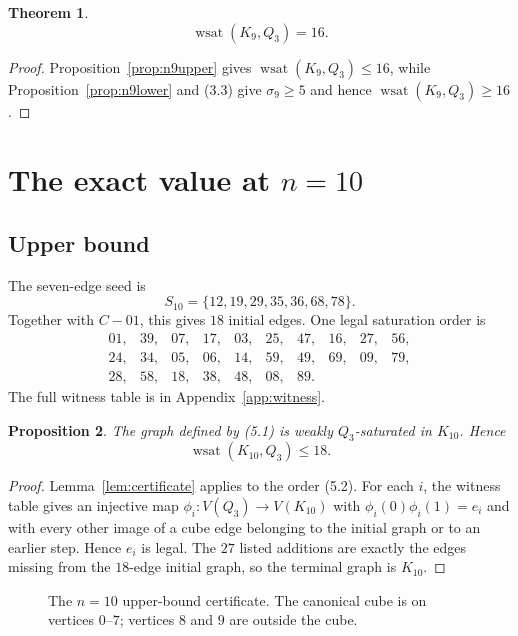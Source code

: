 \documentclass[11pt]{article}
\numberwithin{equation}{section}
\newtheorem{theorem}{Theorem}[section]
\newtheorem{proposition}[theorem]{Proposition}
\newcommand{\wsat}{\operatorname{wsat}}
\begin{document}
\begin{theorem}\label{thm:n9}
\[
\boxed{\wsat(K_9,Q_3)=16.}
\]
\end{theorem}

\begin{proof}
Proposition~\ref{prop:n9upper} gives $\wsat(K_9,Q_3)\le16$, while Proposition~\ref{prop:n9lower} and (3.3) give $\sigma_9\ge5$ and hence $\wsat(K_9,Q_3)\ge16$.
\end{proof}

\section{\texorpdfstring{The exact value at $n=10$}{The exact value at n=10}}\label{sec:n10}

\subsection{Upper bound}
The seven-edge seed is
\[
S_{10}=\{12,19,29,35,36,68,78\}.
\tag{5.1}
\]
Together with $C-01$, this gives $18$ initial edges. One legal saturation order is
\[
\begin{array}{cccccccccc}
01,&39,&07,&17,&03,&25,&47,&16,&27,&56,\\
24,&34,&05,&06,&14,&59,&49,&69,&09,&79,\\
28,&58,&18,&38,&48,&08,&89.
\end{array}
\tag{5.2}
\]
The full witness table is in Appendix~\ref{app:witness}.

\begin{proposition}\label{prop:n10upper}
The graph defined by (5.1) is weakly $Q_3$-saturated in $K_{10}$. Hence
\[
\wsat(K_{10},Q_3)\le18.
\]
\end{proposition}

\begin{proof}
Lemma~\ref{lem:certificate} applies to the order (5.2). For each $i$, the witness table gives an injective map $\phi_i:V(Q_3)\to V(K_{10})$ with $\phi_i(0)\phi_i(1)=e_i$ and with every other image of a cube edge belonging to the initial graph or to an earlier step. Hence $e_i$ is legal. The $27$ listed additions are exactly the edges missing from the $18$-edge initial graph, so the terminal graph is $K_{10}$.
\end{proof}

\begin{figure}[t]
\centering
\resizebox{0.72\linewidth}{!}{}
\caption{The $n=10$ upper-bound certificate. The canonical cube is on vertices $0$--$7$; vertices $8$ and $9$ are outside the cube.}
\label{fig:n10seed}
\end{figure}
\end{document}
